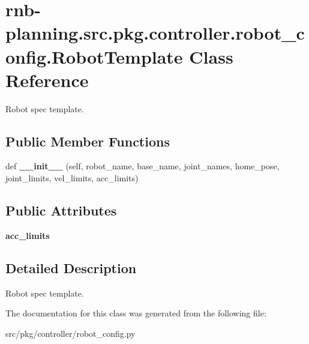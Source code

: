 \hypertarget{classrnb-planning_1_1src_1_1pkg_1_1controller_1_1robot__config_1_1_robot_template}{}\section{rnb-\/planning.src.\+pkg.\+controller.\+robot\+\_\+config.\+Robot\+Template Class Reference}
\label{classrnb-planning_1_1src_1_1pkg_1_1controller_1_1robot__config_1_1_robot_template}


Robot spec template.  


\subsection*{Public Member Functions}
\begin{DoxyCompactItemize}
\item 
\mbox{\label{classrnb-planning_1_1src_1_1pkg_1_1controller_1_1robot__config_1_1_robot_template_af988e39e9e699718b6735f1b2445ed6d}} 
def {\bfseries \+\_\+\+\_\+init\+\_\+\+\_\+} (self, robot\+\_\+name, base\+\_\+name, joint\+\_\+names, home\+\_\+pose, joint\+\_\+limits, vel\+\_\+limits, acc\+\_\+limits)
\end{DoxyCompactItemize}
\subsection*{Public Attributes}
\begin{DoxyCompactItemize}
\item 
\mbox{\label{classrnb-planning_1_1src_1_1pkg_1_1controller_1_1robot__config_1_1_robot_template_aff45ea01ef0abfd823fd1fadb61954fb}} 
{\bfseries acc\+\_\+limits}
\end{DoxyCompactItemize}


\subsection{Detailed Description}
Robot spec template. 

The documentation for this class was generated from the following file\+:\begin{DoxyCompactItemize}
\item 
src/pkg/controller/robot\+\_\+config.\+py\end{DoxyCompactItemize}
